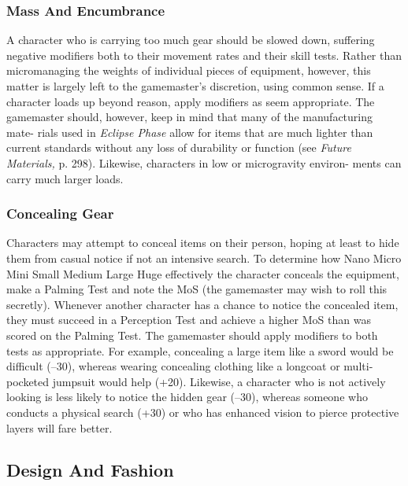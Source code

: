 \subsubsection{Mass And Encumbrance}

A character who is carrying too much gear should 
be slowed down, suffering negative modifiers  both 
to their movement rates and their skill tests. Rather 
than micromanaging the weights of individual pieces 
of equipment, however, this matter is largely left to 
the gamemaster's discretion, using common sense. If a 
character loads up beyond reason, apply modifiers as 
seem appropriate. The gamemaster should, however, 
keep in mind that many of the manufacturing mate-
rials used in \textit{Eclipse Phase} allow for items that are 
much lighter than current standards without any loss 
of durability or function (see \textit{Future Materials,} p. 298). 
Likewise, characters in low or microgravity environ-
ments can carry much larger loads.

\subsubsection{Concealing Gear}

Characters may attempt to conceal items on their 
person, hoping at least to hide them from casual 
notice if not an intensive search. To determine how 
Nano
Micro
Mini
Small
Medium
Large
Huge
effectively the character conceals the equipment, make 
a Palming Test and note the MoS (the gamemaster 
may wish to roll this secretly). Whenever another 
character has a chance to notice the concealed item, 
they must succeed in a Perception Test and achieve 
a higher MoS than was scored on the Palming Test. 
The gamemaster should apply modifiers to both tests 
as appropriate. For example, concealing a large item 
like a sword would be difficult (–30), whereas wearing 
concealing clothing like a longcoat or multi-pocketed 
jumpsuit would help (+20). Likewise, a character 
who is not actively looking is less likely to notice the 
hidden gear (–30), whereas someone who conducts a 
physical search (+30) or who has enhanced vision to 
pierce protective layers will fare better.

\subsection{Design And Fashion}

